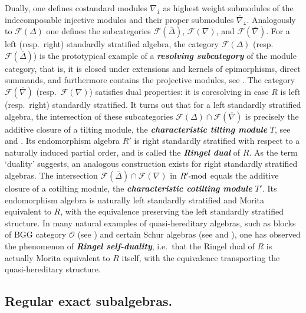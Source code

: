 \documentclass[12pt,a4paper]{amsart}
\theoremstyle{plain}
\theoremstyle{definition}
\numberwithin{equation}{thm}
\newcommand{\emphbf}[1]{\emph{\textbf{#1}}}
\newcommand{\modu}[1]{#1\hbox{-}\mathrm{mod}}
\begin{document}
Dually, one defines costandard modules $\nabla_\mathtt{i}$ as highest weight submodules of the indecomposable injective modules and their proper submodules $\overline{\nabla}_\mathtt{i}$. Analogously to $\mathcal{F}(\Delta)$ one defines the  subcategories $\mathcal{F}(\overline{\Delta})$, $\mathcal{F}(\nabla)$, and $\mathcal{F}(\overline{\nabla})$. For a left (resp.~right) standardly stratified algebra, the category $\mathcal{F}(\Delta)$ (resp.~$\mathcal{F}(\overline{\Delta})$) is the prototypical example of a \emphbf{resolving subcategory} of the module category, that is, it is closed under extensions and kernels of epimorphisms, direct summands, and furthermore contains the projective modules, see \cite[Theorem 1.6]{AHLU00}. The category $\mathcal{F}(\overline{\nabla})$ (resp.~$\mathcal{F}(\nabla)$) satisfies dual properties: it is coresolving in case $R$ is left (resp.~right) standardly stratified. It turns out that for a left standardly stratified algebra, the intersection of these subcategories $\mathcal{F}(\Delta)\cap \mathcal{F}(\overline{\nabla})$ is precisely the additive closure of a tilting module, the \emphbf{characteristic tilting module} $T$, see \cite[Proposition 2.2]{AHLU00} and \cite[Theorem 5]{Rin91}. Its endomorphism algebra $R'$ is right standardly stratified with respect to a naturally induced partial order, and is called the \emphbf{Ringel dual} of $R$. As the term `duality' suggests, an analogous construction exists for right standardly stratified algebras. The intersection $\mathcal{F}(\overline{\Delta})\cap \mathcal{F}(\nabla)$ in $\modu{R'}$ equals the additive closure of a cotilting module, the \emphbf{characteristic cotilting module} $T'$. Its endomorphism algebra is naturally left standardly stratified and Morita equivalent to $R$, with the equivalence preserving the left standardly stratified structure. In many natural examples of quasi-hereditary algebras, such as blocks of BGG category $\mathcal{O}$ (see \cite[Struktursatz 9]{Soe90}) and certain Schur algebras (see \cite[Proposition 3.7]{Don93} and \cite[Theorem 27]{EH02}), one has observed the phenomenon of \emphbf{Ringel self-duality}, i.e.\ that the Ringel dual of $R$ is actually Morita equivalent to $R$ itself, with the equivalence transporting the quasi-hereditary structure.

\subsection{Regular exact subalgebras.}
\end{document}
